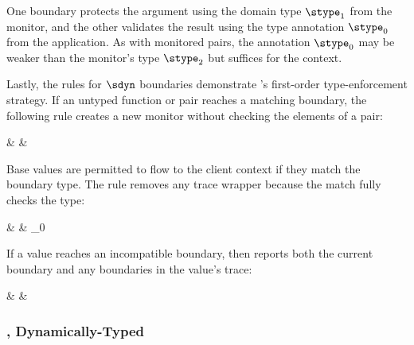 \noindent
One boundary protects the argument
 using the domain type $\stype_1$ from the monitor,
 and the other validates the result using the type annotation $\stype_0$ from
 the application.
As with monitored pairs, the annotation $\stype_0$ may be weaker
 than the monitor's type $\stype_2$ but suffices for the context.

Lastly, the rules for $\sdyn$ boundaries demonstrate \Aname{}'s first-order
 type-enforcement strategy.
If an untyped function or pair reaches a matching boundary, the following rule
 creates a new monitor without checking the elements of a pair:

\begin{inlinerrarray}
      &  \nredAS
      &  
      \\
\end{inlinerrarray}

\noindent
Base values are permitted to flow to the client context if they match the
boundary type.
The rule removes any trace wrapper because the match fully checks the type:

\begin{inlinerrarray}
      &  \nredAS
      &  \sint_0
      \\
\end{inlinerrarray}

\noindent
If a value reaches an incompatible boundary, then \Aname{} reports both the
current boundary and any boundaries in the value's trace:

\begin{inlinerrarray}
      &  \nredAS
      &  
      \\
\end{inlinerrarray}


\subsubsection{\Aname{}, Dynamically-Typed}

